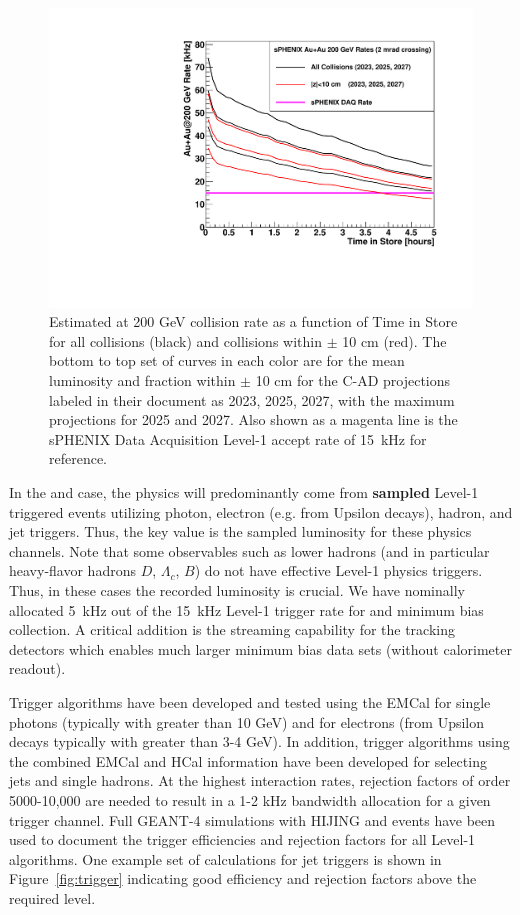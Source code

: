 \begin{figure}
\centering
\includegraphics[width=0.70\linewidth]{figs/figure_auauratestore_2mrad.pdf} 
\caption{Estimated \auau at 200 GeV collision rate as a function of Time in Store for all collisions (black) and collisions within $\pm$ 10 cm (red).  The bottom to top set of curves in each color are for the mean luminosity and fraction within $\pm$ 10 cm for the C-AD projections labeled in their document as 2023, 2025, 2027, with the maximum projections for 2025 and 2027.   Also shown as a magenta line is the sPHENIX Data Acquisition Level-1 accept rate of 15~kHz for reference.
\label{fig:auaulumcurves}}
\end{figure}

In the \pp and \pau case, the physics will predominantly come from {\bf sampled} Level-1 triggered events utilizing photon, electron (e.g. from Upsilon decays), hadron, and
jet triggers.  Thus, the key value is the sampled luminosity for these physics channels.   Note that some observables such as lower \pt hadrons (and in particular heavy-flavor hadrons $D$, $\Lambda_{c}$, $B$) do not have effective Level-1 physics triggers.    Thus, in these cases the recorded luminosity is crucial.    We have nominally allocated 5~kHz out of the 15~kHz Level-1 trigger rate for \pp and \pau minimum bias collection.   A critical addition is the streaming capability for the tracking detectors which enables much larger minimum bias data sets (without calorimeter readout).

Trigger algorithms have been developed and tested using the EMCal for single photons (typically with \pt greater than 10 GeV) and for electrons (from Upsilon decays typically with \pt greater than 3-4 GeV).  In addition, trigger algorithms using the combined EMCal and HCal information have been developed for selecting jets and single hadrons.    At the highest \pp interaction rates, rejection factors of order 5000-10,000 are needed to result in a 1-2 kHz bandwidth allocation for a given trigger channel.    Full {\textsc{GEANT-4}} simulations with {\textsc{HIJING}} \pp and \pau events have been used to document the trigger efficiencies and rejection factors for all Level-1 algorithms.
One example set of calculations for jet triggers is shown in Figure~\ref{fig:trigger} indicating good efficiency and rejection factors above the required level.

